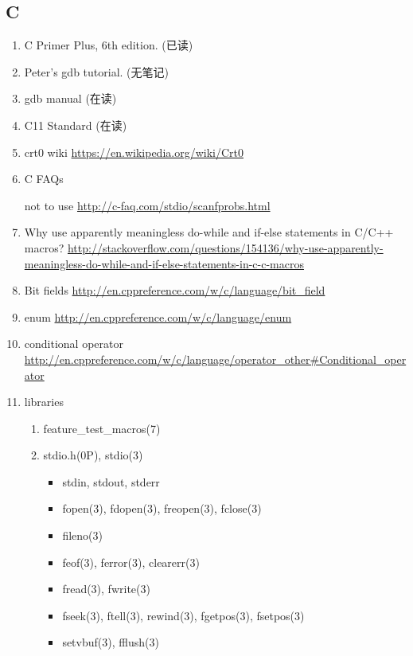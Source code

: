 \documentclass{article}
\begin{document}
\subsection{C}
\begin{enumerate}
    \item C Primer Plus, 6th edition. (已读)
    \item Peter's gdb tutorial. (无笔记)
    \item gdb manual (在读)
    \item C11 Standard (在读)
    \item crt0 wiki \url{https://en.wikipedia.org/wiki/Crt0}
    \item C FAQs
        \begin{itemize}
            not to use  \url{http://c-faq.com/stdio/scanfprobs.html}
        \end{itemize}
    \item Why use apparently meaningless do-while and if-else statements in C/C++ macros?
        \url{http://stackoverflow.com/questions/154136/why-use-apparently-meaningless-do-while-and-if-else-statements-in-c-c-macros}
    \item Bit fields \url{http://en.cppreference.com/w/c/language/bit_field}
    \item enum \url{http://en.cppreference.com/w/c/language/enum}
    \item conditional operator \url{http://en.cppreference.com/w/c/language/operator_other#Conditional_operator}
    \item libraries
        \begin{enumerate}
            \item feature_test_macros(7)
            \item stdio.h(0P), stdio(3)
                \begin{itemize}
                    \item stdin, stdout, stderr
                    \item fopen(3), fdopen(3), freopen(3), fclose(3)
                    \item fileno(3)
                    \item feof(3), ferror(3), clearerr(3)
                    \item fread(3), fwrite(3)
                    \item fseek(3), ftell(3), rewind(3), fgetpos(3), fsetpos(3)
                    \item setvbuf(3), fflush(3)


\end{itemize}
\end{enumerate}
\end{enumerate}
\end{document}
